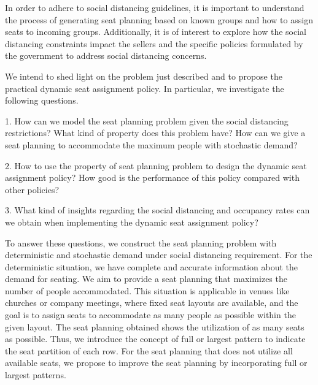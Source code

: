 In order to adhere to social distancing guidelines, it is important to understand the process of generating seat planning based on known groups and how to assign seats to incoming groups. Additionally, it is of interest to explore how the social distancing constraints impact the sellers and the specific policies formulated by the government to address social distancing concerns.

We intend to shed light on the problem just described and to propose the practical dynamic seat assignment policy. In particular, we investigate the following questions. 

1. How can we model the seat planning problem given the social distancing restrictions? What kind of property does this problem have? How can we give a seat planning to accommodate the maximum people with stochastic demand?

2. How to use the property of seat planning problem to design the dynamic seat assignment policy? How good is the performance of this policy compared with other policies?

3. What kind of insights regarding the social distancing and occupancy rates can we obtain when implementing the dynamic seat assignment policy?


To answer these questions, we construct the seat planning problem with deterministic and stochastic demand under social distancing requirement. For the deterministic situation, we have complete and accurate information about the demand for seating. We aim to provide a seat planning that maximizes the number of people accommodated. This situation is applicable in venues like churches or company meetings, where fixed seat layouts are available, and the goal is to assign seats to accommodate as many people as possible within the given layout. The seat planning obtained shows the utilization of as many seats as possible. Thus, we introduce the concept of full or largest pattern to indicate the seat partition of each row. For the seat planning that does not utilize all available seats, we propose to improve the seat planning by incorporating full or largest patterns.

